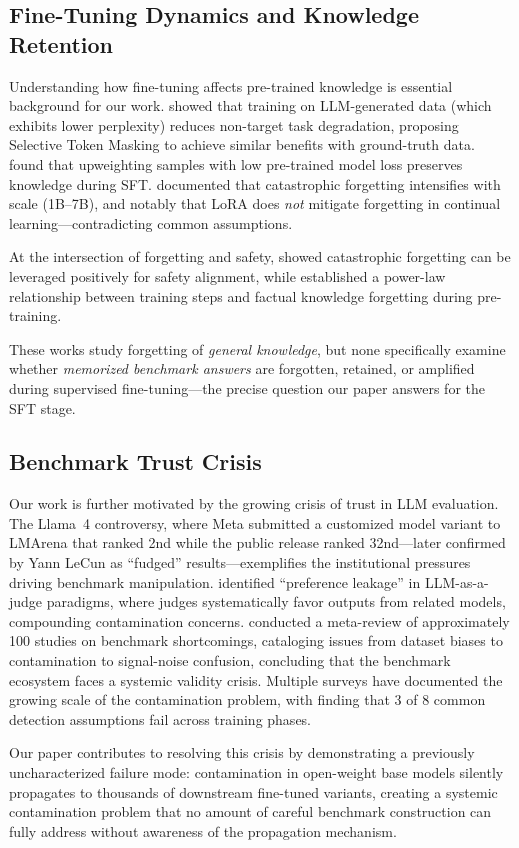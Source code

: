 \subsection{Fine-Tuning Dynamics and Knowledge Retention}

Understanding how fine-tuning affects pre-trained knowledge is essential background for our work. \citet{wu2025forgetting} showed that training on LLM-generated data (which exhibits lower perplexity) reduces non-target task degradation, proposing Selective Token Masking to achieve similar benefits with ground-truth data. \citet{upweight2025easy} found that upweighting samples with low pre-trained model loss preserves knowledge during SFT. \citet{empirical2024forgetting} documented that catastrophic forgetting intensifies with scale (1B--7B), and notably that LoRA does \emph{not} mitigate forgetting in continual learning---contradicting common assumptions.

At the intersection of forgetting and safety, \citet{leveraging2024forgetting} showed catastrophic forgetting can be leveraged positively for safety alignment, while \citet{factual2024pretraining} established a power-law relationship between training steps and factual knowledge forgetting during pre-training.

These works study forgetting of \emph{general knowledge}, but none specifically examine whether \emph{memorized benchmark answers} are forgotten, retained, or amplified during supervised fine-tuning---the precise question our paper answers for the SFT stage.

\subsection{Benchmark Trust Crisis}

Our work is further motivated by the growing crisis of trust in LLM evaluation. The Llama~4 controversy, where Meta submitted a customized model variant to LMArena that ranked 2nd while the public release ranked 32nd---later confirmed by Yann LeCun as ``fudged'' results---exemplifies the institutional pressures driving benchmark manipulation. \citet{li2025preference} identified ``preference leakage'' in LLM-as-a-judge paradigms, where judges systematically favor outputs from related models, compounding contamination concerns. \citet{eriksson2025trust} conducted a meta-review of approximately 100 studies on benchmark shortcomings, cataloging issues from dataset biases to contamination to signal-noise confusion, concluding that the benchmark ecosystem faces a systemic validity crisis. Multiple surveys \citep{deng2024unveiling,xu2024bdcsurvey,li2025dcsurvey,comprehensive2025detection,static2dynamic2025} have documented the growing scale of the contamination problem, with \citet{assumptions2024detection} finding that 3 of 8 common detection assumptions fail across training phases.

Our paper contributes to resolving this crisis by demonstrating a previously uncharacterized failure mode: contamination in open-weight base models silently propagates to thousands of downstream fine-tuned variants, creating a systemic contamination problem that no amount of careful benchmark construction can fully address without awareness of the propagation mechanism.
